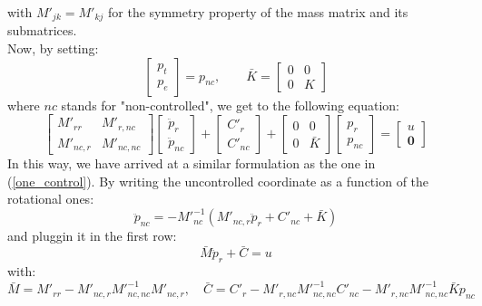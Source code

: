 \documentclass[a4paper,12pt,oneside]{report}
\begin{document}
with $M'_{jk}=M'_{kj}$ for the symmetry property of the mass matrix and its submatrices.\\
Now, by setting:
\begin{equation}
  \begin{bmatrix}
    p_t\\
    p_e
  \end{bmatrix}=p_{nc}, \quad \quad \bar{K}=\begin{bmatrix}
    0&0\\
    0&K
  \end{bmatrix}
\end{equation}
where $nc$ stands for "non-controlled", we get to the following equation:
\begin{equation}
  \begin{bmatrix}
    M'_{rr}&M'_{r,nc}\\
    M'_{nc,r}&M'_{nc,nc}
  \end{bmatrix}\begin{bmatrix}
    \ddot{p}_r\\
    \ddot{p}_{nc}
  \end{bmatrix}+\begin{bmatrix}
    C'_r\\
    C'_{nc}
  \end{bmatrix}+\begin{bmatrix}
    0&0\\
    0&\bar{K}
  \end{bmatrix}\begin{bmatrix}
    p_r\\
    p_{nc}
  \end{bmatrix}=\begin{bmatrix}
    u\\
    \textbf{0}
  \end{bmatrix}
\end{equation}
In this way, we have arrived at a similar formulation as the one in (\ref{one_control}). By writing the uncontrolled coordinate as a function of the rotational ones:
\begin{equation}
  \ddot{p}_{nc}=-{M'}_{nc}^{-1}({M'}_{nc,r}\ddot{p}_r+{C'}_{nc}+\bar{K})
\end{equation}
and pluggin it in the first row:
\begin{equation}
  \bar{M}\ddot{p}_r+\bar{C}=u
\end{equation}
with:
\begin{equation}
  \bar{M}=M'_{rr}-M'_{nc,r}{M'}_{nc,nc}^{-1}M'_{nc,r}, \quad \bar{C}=C'_r-M'_{r,nc}{M'}_{nc,nc}^{-1}C'_{nc}-{M'}_{r,nc}{M'}_{nc,nc}^{-1}\bar{K}p_{nc}
\end{equation}
\end{document}
